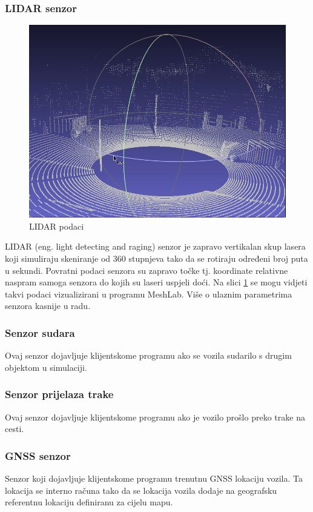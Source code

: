 \subsubsection{LIDAR senzor}
\begin{figure}[ht!]
  \centering
  \includegraphics[scale=0.5]{images/LIDAR_examaple.png}
  \caption{LIDAR podaci\cite{carla:sensors}}
  \label{fig:lidar_exmaple}
\end{figure}
LIDAR (eng. light detecting and raging) senzor je zapravo vertikalan skup lasera koji simuliraju skeniranje od 360 stupnjeva tako da se rotiraju određeni broj puta u sekundi. Povratni podaci senzora su zapravo točke tj. koordinate relativne naspram samoga senzora do kojih su laseri uspjeli doći. Na slici \ref{fig:lidar_exmaple} se mogu vidjeti takvi podaci vizualizirani u programu MeshLab. Više o ulaznim parametrima senzora kasnije u radu.

\subsubsection{Senzor sudara}
Ovaj senzor dojavljuje klijentskome programu ako se vozila sudarilo s drugim objektom u simulaciji.

\subsubsection{Senzor prijelaza trake}
Ovaj senzor dojavljuje klijentskome programu ako je vozilo prošlo preko trake na cesti.

\subsubsection{GNSS senzor}
Senzor koji dojavljuje klijentskome programu trenutnu GNSS lokaciju vozila. Ta lokacija se interno računa tako da se lokacija vozila dodaje na geografsku referentnu lokaciju definiranu za cijelu mapu.

